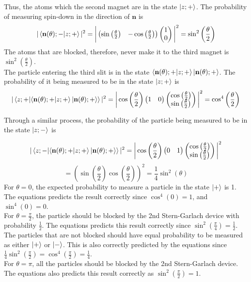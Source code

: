 \begin{sol}
\begin{enumerate}[label=\textbf{(\alph*)}]
Thus, the atoms which the second magnet are in the state $\ket{z;+}$. The probability of measuring spin-down in the direction of $\mathbf{n}$ is 
$$|\braket{\mathbf{n}(\theta);-}{z;+}|^2=\bigg|\begin{pmatrix}\sin\left(\frac{\theta}{2}\right)&-\cos\left(\frac{\theta}{2}\right)\end{pmatrix}\begin{pmatrix}1\\0\end{pmatrix}\bigg|^2=\sin^2\left(\frac{\theta}{2}\right)$$
The atoms that are blocked, therefore, never make it to the third magnet is $\sin^2(\frac{\theta}{2})$.\\
The particle entering the third slit is in the state $\braket{\mathbf{n}(\theta);+}{z;+}\ket{\mathbf{n}(\theta);+}$. The probability of it being measured to be in the state $\ket{z;+}$ is
$$|\braket{z;+}{\braket{\mathbf{n}(\theta);+}{z;+}\ket{\mathbf{n}(\theta);+}}|^2=\bigg|\cos\left(\frac{\theta}{2}\right)\begin{pmatrix}1&0\end{pmatrix}\begin{pmatrix}\cos\left(\frac{\theta}{2}\right)\\\sin\left(\frac{\theta}{2}\right)\end{pmatrix}\bigg|^2=\cos^4\left(\frac{\theta}{2}\right)$$

Through a similar process, the probability of the particle being measured to be in the state $\ket{z;-}$ is

$$|\braket{z;-}{\braket{\mathbf{n}(\theta);+}{z;+}\ket{\mathbf{n}(\theta);+}}|^2=\bigg|\cos\left(\frac{\theta}{2}\right)\begin{pmatrix}0&1\end{pmatrix}\begin{pmatrix}\cos\left(\frac{\theta}{2}\right)\\\sin\left(\frac{\theta}{2}\right)\end{pmatrix}\bigg|^2$$
$$=\left(\sin\left(\frac{\theta}{2}\right)\cos\left(\frac{\theta}{2}\right)\right)^2=\frac{1}{4}\sin^2(\theta)$$
For $\theta=0$, the expected probability to measure a particle in the state $\ket +$ is 1. The equations predicts the result correctly since $\cos^4(0)=1$, and $\sin^4(0)=0$.\\
For $\theta=\frac{\pi}{2}$, the particle should be blocked by the 2nd Stern-Garlach device with probability $\frac{1}{2}$. The equations predicts this result correctly since $\sin^2(\frac{\pi}{4})=\frac{1}{2}$. The particles that are not blocked should have equal probability to be measured as either $\ket+$ or $\ket-$. This is also correctly predicted by the equations since $\frac{1}{4}\sin^2(\frac{\pi}{2})=\cos^4(\frac{\pi}{2})=\frac{1}{4}$.\\
For $\theta=\pi$, all the particles should be blocked by the 2nd Stern-Garlach device. The equations also predicts this result correctly as $\sin^2(\frac{\pi}{2})=1$.
\end{enumerate}
\end{sol}